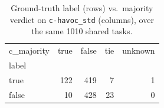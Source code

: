 \begin{table}[t]
  \centering
  \caption{Ground-truth label (rows) vs.\ majority verdict on \texttt{c-havoc_std} (columns), over the same 1010 shared tasks.}
  \label{tab:label-majority-c-havoc_std}
\begin{tabular}{lrrrr}
\toprule
c_majority & true & false & tie & unknown \\
label &  &  &  &  \\
\midrule
true & 122 & 419 & 7 & 1 \\
false & 10 & 428 & 23 & 0 \\
\bottomrule
\end{tabular}
\end{table}
